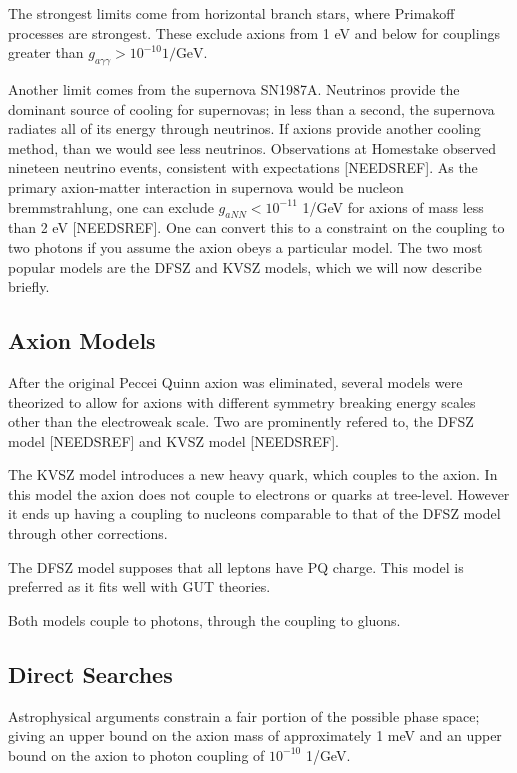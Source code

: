 \documentclass[12pt, twoside]{book}
\begin{document}
The strongest limits come from horizontal branch stars, where Primakoff processes are strongest. These exclude axions from 1 eV and below for couplings greater than $g_{a\gamma\gamma} > 10^{-10} \text{1}/\text{GeV}$.

Another limit comes from the supernova SN1987A. Neutrinos provide the dominant source of cooling for supernovas; in less than a second, the supernova radiates all of its energy through neutrinos. If axions provide another cooling method, than we would see less neutrinos. Observations at Homestake observed nineteen neutrino events, consistent with expectations [NEEDSREF]. As the primary axion-matter interaction in supernova would be nucleon bremmstrahlung, one can exclude $g_{aNN} < 10^{-11}$ 1/GeV for axions of mass less than 2 eV [NEEDSREF]. One can convert this to a constraint on the coupling to two photons if you assume the axion obeys a particular model. The two most popular models are the DFSZ and KVSZ models, which we will now describe briefly.

\subsection{Axion Models}

After the original Peccei Quinn axion was eliminated, several models were theorized to allow for axions with different symmetry breaking energy scales other than the electroweak scale. Two are prominently refered to, the DFSZ model [NEEDSREF] and KVSZ model [NEEDSREF].

The KVSZ model introduces a new heavy quark, which couples to the axion. In this model the axion does not couple to electrons or quarks at tree-level. However it ends up having a coupling to nucleons comparable to that of the DFSZ model through other corrections.

The DFSZ model supposes that all leptons have PQ charge. This model is preferred as it fits well with GUT theories.

Both models couple to photons, through the coupling to gluons.

\subsection{Direct Searches}

Astrophysical arguments constrain a fair portion of the possible phase space; giving an upper bound on the axion mass of approximately 1 meV and an upper bound on the axion to photon coupling of $10^{-10}$ 1/GeV.
\end{document}
